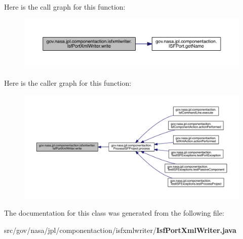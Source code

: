 Here is the call graph for this function\+:
\nopagebreak
\begin{figure}[H]
\begin{center}
\leavevmode
\includegraphics[width=350pt]{classgov_1_1nasa_1_1jpl_1_1componentaction_1_1isfxmlwriter_1_1_isf_port_xml_writer_a6f5cbcab76d8872a8be33d4f9eb764c5_cgraph}
\end{center}
\end{figure}




Here is the caller graph for this function\+:
\nopagebreak
\begin{figure}[H]
\begin{center}
\leavevmode
\includegraphics[width=350pt]{classgov_1_1nasa_1_1jpl_1_1componentaction_1_1isfxmlwriter_1_1_isf_port_xml_writer_a6f5cbcab76d8872a8be33d4f9eb764c5_icgraph}
\end{center}
\end{figure}




The documentation for this class was generated from the following file\+:\begin{DoxyCompactItemize}
\item 
src/gov/nasa/jpl/componentaction/isfxmlwriter/{\bf Isf\+Port\+Xml\+Writer.\+java}\end{DoxyCompactItemize}

